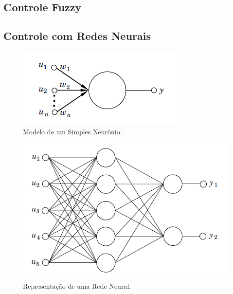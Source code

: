 \subsection{Controle Fuzzy} %


\subsection{Controle com Redes Neurais}  %

\begin{figure}[!ht]
  \caption{Modelo de um Simples Neurônio.}
  \begin{center}
      \includegraphics[scale=0.6]{img/neuron_astrom_p295}
  \end{center}
  \label{fig:neuron_astrom_p295}
\end{figure}

\begin{figure}[!ht]
  \caption{Representação de uma Rede Neural.}
  \begin{center}
      \includegraphics[scale=0.65]{img/feedforward_neural_astrom_p297}
  \end{center}
  \label{fig:feedforward_neural_astrom_p297}
\end{figure}

